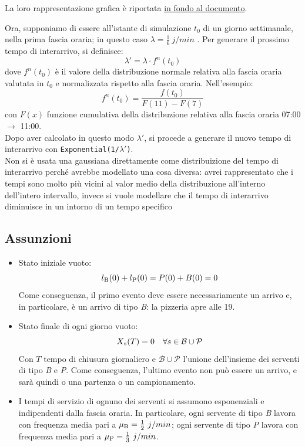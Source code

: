 \documentclass[a4paper, 12pt]{article}
\begin{document}
La loro rappresentazione grafica è riportata \hyperlink{rappresentazione grafica gaussiane}{in fondo al documento}. 
\bigskip

Ora, supponiamo di essere all'istante di simulazione $t_0$ di un giorno settimanale, nella prima fascia oraria; in questo caso $\lambda = \frac{1}{6}\ j/min$ .  Per generare il prossimo tempo di interarrivo, si definisce:
\[
\lambda' = \lambda \cdot f^n(t_0)
\]
dove $f^n(t_0)$ è il valore della distribuzione normale relativa alla fascia oraria valutata in $t_0$ e normalizzata rispetto alla fascia oraria. Nell'esempio:
\[
f^n(t_0) = \frac{f(t_0)}{F(11) - F(7)}
\]
con $F(x)$ funzione cumulativa della distribuzione relativa alla fascia oraria 07:00 $\rightarrow$ 11:00.\\
Dopo aver calcolato in questo modo $\lambda'$, si procede a generare il nuovo tempo di interarrivo con \texttt{Exponential(1/}$\lambda'$\texttt{)}.\\

Non si è usata una gaussiana direttamente come distribuizione del tempo di interarrivo perché avrebbe modellato una cosa diversa: avrei rappresentato che i tempi sono molto più vicini al valor medio della distribuzione all'interno dell'intero intervallo, invece si vuole modellare che il tempo di interarrivo diminuisce in un intorno di un tempo specifico




\subsection{Assunzioni}
\begin{itemize}
  \item Stato iniziale vuoto: 
  \[ 
    l\textsubscript{B}(0) + l\textsubscript{P}(0) = P(0) + B(0) = 0 
\]
  Come conseguenza, il primo evento deve essere necessariamente un arrivo e, in particolare, è un arrivo di tipo \textit{B}: la pizzeria apre alle 19.
  \item Stato finale di ogni giorno vuoto:
\[
    X\textsubscript{s}(T) = 0\ \ \ \forall s \in \mathcal{B} \cup \mathcal{P}
\]
  Con $T$ tempo di chiusura giornaliero e $\mathcal{B} \cup \mathcal{P}$ l'unione dell'insieme dei serventi di tipo \textit{B} e \textit{P}. Come conseguenza, l'ultimo evento non può essere un arrivo, e sarà quindi o una partenza o un campionamento.

  \item I tempi di servizio di ognuno dei serventi si assumono  esponenziali e indipendenti dalla fascia oraria. In particolare, ogni servente di tipo \textit{B} lavora con frequenza media pari a $\mu\textsubscript{B} = \frac{1}{2}\ j/min$; ogni servente di tipo \textit{P} lavora con frequenza media pari a $\mu\textsubscript{P} = \frac{1}{3}\ j/min$.

  
\end{itemize}
\end{document}
